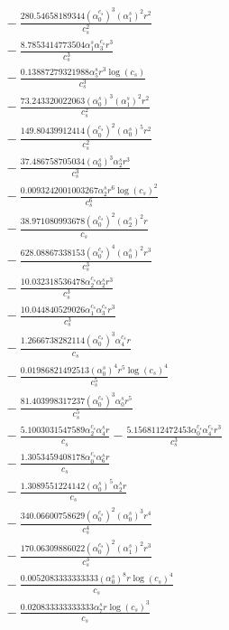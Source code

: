 \documentclass[10pt]{article}
\begin{document}
\begin{align*}
&{}  - \frac{280.54658189344 \left(\alpha_{0}^{c_s}\right)^{3} \left(\alpha_{1}^s\right)^{2} r^{2}}{c_{s}^{2}} \\
&{}  - \frac{8.7853414773504 \alpha_{1}^s \alpha_{3}^{c_s} r^{3}}{c_{s}^{3}} \\
&{}  - \frac{0.13887279321988 \alpha_{5}^s r^{3} \log{\left(c_{s} \right)}}{c_{s}^{3}} \\
&{}  - \frac{73.243320022063 \left(\alpha_{0}^s\right)^{3} \left(\alpha_{1}^s\right)^{2} r^{2}}{c_{s}^{2}} \\
&{}  - \frac{149.80439912414 \left(\alpha_{0}^{c_s}\right)^{2} \left(\alpha_{0}^s\right)^{5} r^{2}}{c_{s}^{2}} \\
&{}  - \frac{37.486758705034 \left(\alpha_{0}^s\right)^{3} \alpha_{2}^s r^{3}}{c_{s}^{3}} \\
&{}  - \frac{0.0093242001003267 \alpha_{2}^s r^{6} \log{\left(c_{s} \right)}^{2}}{c_{s}^{6}} \\
&{}  - \frac{38.971080993678 \left(\alpha_{0}^{c_s}\right)^{2} \left(\alpha_{2}^s\right)^{2} r}{c_{s}} \\
&{}  - \frac{628.08867338153 \left(\alpha_{0}^{c_s}\right)^{4} \left(\alpha_{0}^s\right)^{2} r^{3}}{c_{s}^{3}} \\
&{}  - \frac{10.032318536478 \alpha_{2}^{c_s} \alpha_{2}^s r^{3}}{c_{s}^{3}} \\
&{}  - \frac{10.044840529026 \alpha_{1}^{c_s} \alpha_{3}^{c_s} r^{3}}{c_{s}^{3}} \\
&{}  - \frac{1.2666738282114 \left(\alpha_{0}^{c_s}\right)^{3} \alpha_{4}^{c_s} r}{c_{s}} \\
&{}  - \frac{0.01986821492513 \left(\alpha_{0}^s\right)^{4} r^{5} \log{\left(c_{s} \right)}^{4}}{c_{s}^{5}} \\
&{}  - \frac{81.403998317237 \left(\alpha_{0}^{c_s}\right)^{3} \alpha_{0}^s r^{5}}{c_{s}^{5}} \\
&{}  - \frac{5.1003031547589 \alpha_{2}^{c_s} \alpha_{4}^s r}{c_{s}} - \frac{5.1568112472453 \alpha_{0}^{c_s} \alpha_{4}^{c_s} r^{3}}{c_{s}^{3}} \\
&{}  - \frac{1.3053459408178 \alpha_{0}^{c_s} \alpha_{6}^s r}{c_{s}} \\
&{}  - \frac{1.3089551224142 \left(\alpha_{0}^s\right)^{5} \alpha_{2}^s r}{c_{s}} \\
&{}  - \frac{340.06600758629 \left(\alpha_{0}^{c_s}\right)^{2} \left(\alpha_{0}^s\right)^{3} r^{4}}{c_{s}^{4}} \\
&{}  - \frac{170.06309886022 \left(\alpha_{0}^{c_s}\right)^{2} \left(\alpha_{1}^s\right)^{2} r^{3}}{c_{s}^{3}} \\
&{}  - \frac{0.0052083333333333 \left(\alpha_{0}^s\right)^{8} r \log{\left(c_{s} \right)}^{4}}{c_{s}} \\
&{}  - \frac{0.020833333333333 \alpha_{7}^s r \log{\left(c_{s} \right)}^{3}}{c_{s}}
\end{align*}
\end{document}

